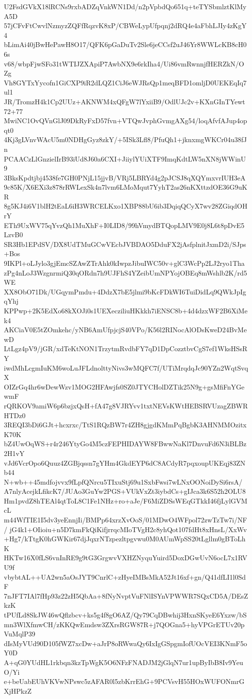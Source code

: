 U2FsdGVkX18lRCNs9rxbADZqVnkWN1Dd/n2pVpbdQo651q+teTYSbmlztKlMyA5D
57jCFvFtCwvlNzmyzZQFfRqzvK8xP/CBWeLypUfpqnj2dRQ4e4aFbhLJIy4zKgY4
bLimAi40jBwHePawH8O17/QFK6pGaDuTv2Sle6jeCCsf2uJ46Yr8WWLcKB8cH06s
v68/wbpFjwSFo31tWTIJZXApiP7AwbNX9e6rkIha4/Ui86vmRwnnjfHERZkN/OZg
Vh8GYTxYycofn1GiCXP9iR2dLQZ1CiJ6eWJRsQp1meqBFD1omljD0UEKEqIq7ul1
JR/TromzH4k1Cp2UUz+AKNWM4xQFgW7lYxiiB9/OdlUJc2v+KXnGInTYewt72+77
MwiNC1OvQVnGlJ09DkRyFxD57fvn+VTQwJvphGvmgAXg54/loqAfvfAJup4opqt0
4Kj3gLVnvWAcU5m0NDHgGyz8zkY/+5ISk3Lfl8/PfuQh1+jknxmgWKCr04u38fJn
PCAACzLlGnzielIrB93iUd8J60a6CXI+JiiylYUiXTF9ImqKdtLW5nXN8jWWinU9
3BksKpdtjbj4538fe7GH0PNjL15jjvB/VRj5LBRYd4g2pJCSJ8qXQYmxvrIUH3eA
9c85K/X6EXi3z878rRWLexSk4n7lvm6LMoMqut7YyhT2as26nKXttzdOE36G9uKR
8g5KJ4i6V1blH2tEaL6iH3WRCELKxo1XBP88bU6ib3DqiqQCyX7wv28ZGiqdOHrY
ETh9UxWV75qYvzQh1MuXhF+I0LID8/99hVmydBTQopLMV9E0j8L6t8pDvE5LzvB0
SR3Hb1EPdSV/DX8UdTMuGCwVEcbJVBDAO5DduFX2jAsfplnitJxmD2i/SJps+Bos
9IKPl+oLJylo3gjEmcSZAwZTrAhk0kIwpzJibuIWC50v+glC3WcPp2LJ2ryo1Tha
zPg4nLoJ3WzgnrmiQ30qORdn7h9UJFhS4YZeibUmNPYojOBEq8mWshlb2K/rd5WE
XX8ObO71Dk/UGqymPmdu+4DdzX7bE5jlmi9bKcFDkWI6TuiDidLq9QWkJpIgqYhj
KPPwp+2K5EdXo68kXOJi0s1UEXecziliuHKkkh7iENSC8b+4d4dzxWF2B6XiMek4
AKCiaV0E5tZOmkehc/yNB6AmUfpjcjS40VPo/K56l2RINocAlODsKweD24BvMewD
LtLgz4pV9/jGR/xdTeKtNON1TrzytmRvdbFY7qD1DpCozztbvCgS7ef1WksHSsRY
iwdMhLcgmIuKM6woLuJFLdnolttyNivs3wMQFC7f/UTiMrqdqJc90YZn2WqtSvqX
OIZrGq4hr6wDewWzv1MOG2HFAwjfs0SZ0JTYCHolDZTik25N9g+gsMfiFnYGewmF
rQRKOV9amiW6p6bzjxQsH+fA47g8VJRYvv1txtNEVsKWtHEBSRVUzagZBWRHTDz0
3REQI3bDi6GJt+hcxrxc/TtS1RQzBW7r4ZH8gjgdKMmPqBgbK3AHNMMOzitxK70K
bZ4UwOqWS+r4r246YtyGo4M5czFEPHIDAYW8FBwwNaKl7DnvuFd6N3iBLBz2H1vY
vJd6VcrOpo6Quuz4ZGBjqssn7gYHm4GkdEYP6dC8ACdyR7pqxoupUKEqj83ZNb44
N+wb++45mdfojvvx9fLpfQNrcu5TIxuStj69u1SxbFwsi7wLNxOONoiDySi6rsA/
A7nlyAcejkLfikcK7/JUAo3GuYw2PGS+VUkVxZt3iybdCs+gIJca3k6S52h2OLU8
Hm1pvdZ8hTEAl4qtToL8C1Fe1NHz+ro+aJe/F6MiZDSsWEqGTkkI46fjLylGVMcL
m44WfTIE1I5dv3yeEnnjIi/BMPp64xrzXvOoS/01MDwO4WFpol72zwTzTw7i/NF/
jG4k1+OIioiu+n5D7kmFkQiKifjrrqcMIoTVgH2c8yhQot107fdHt8xHnsL/XxWv
+Hg7/kTtgK0hGWKir67djJqxrNTzpezltpgvwu0M0AUmWpSS20tLgllm0gBToLhK
HKTw16X0fLS6vnInRE9g9tG3GrgwvVXHZNyquYuird5DoxDGwUvN6ocL7x1RVU9f
vbybtAL++UA2wn5aOsJYT9CnrlC+zHyeIMBsMkA52Jt16xf+gn/Q41dfLI1l0SdF
7nJFT7IAl7fHp93z22zH5QbAa+8fNyNvptVuFNlISYnVPWWR7SQxCD5A/DEsZkzK
tPUfLd8SkJW46wQflzbcv+ks5g4f8gO6AZ/Qy79CqDBwhij3HxnSKyeE6Yxzw/bS
mn3WlXfmwCH/zKKQwEmdsw3ZXrsRGW87R+j7QOGna5+hyVPGrETUv20pVuMqlP39
dIsMyVUd90D105fWZ7xcDw+aJrP8oRWwaQy6IxIgGSpgmIofUOcVEI3KNmF5oY0D
A+qG0YUdHL1rkbqn3kzTpWgK5O6NFzFNADJM2jGlqN7ur1upByIbB8Iv9YeuO/Yi
e+beUabEUhVKVwNPswc5zAFAR0l5zbKrrEhG+9PCVsvH55HOxWUFONmrGXjHPkzZ
